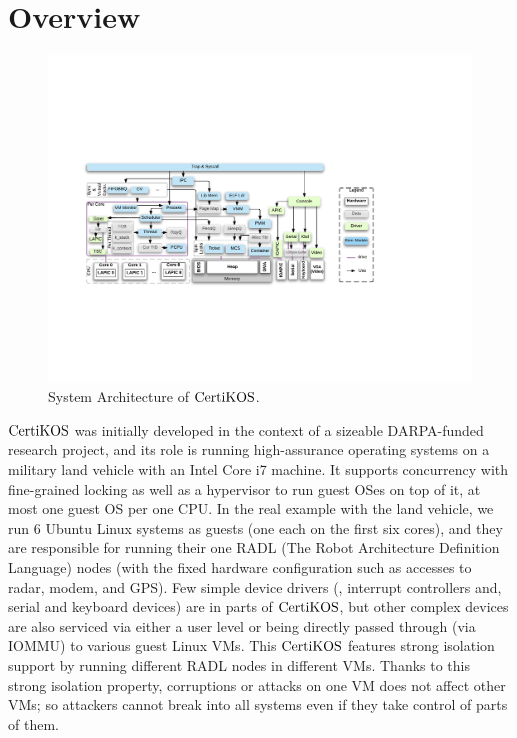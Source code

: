 \section{Overview}
\label{chapter:certikos:sec:overview}

\begin{figure}
\includegraphics[width=\textwidth]{figs/certikos/sysarch}
\caption{System Architecture of $\mathrm{CertiKOS}$.}
\label{fig:chapter:certikos:system-architecture-of-certikos}
\end{figure}

$\mathrm{CertiKOS}$ was initially developed in the context of a sizeable DARPA-funded research project,
and its role is running high-assurance operating systems on a military land vehicle with an Intel Core i7 machine. 
It supports concurrency with fine-grained locking as well as a hypervisor
to run guest OSes on top of it, 
at most one guest OS per one CPU. 
In the real example with the land vehicle, 
we run 6 Ubuntu Linux systems as guests (one each on the first six cores), 
and  they are responsible for running  their one RADL (The Robot Architecture Definition Language) nodes (with the fixed hardware configuration such as accesses to radar, modem, and GPS). 
Few simple device drivers (\eg, interrupt controllers and, serial and keyboard devices)  are in parts of $\mathrm{CertiKOS}$,
but other complex devices are also serviced via either a user level or being directly passed through (via IOMMU) to various guest Linux VMs. 
This $\mathrm{CertiKOS}$ features strong isolation support by running different RADL nodes in different VMs. 
Thanks to this strong isolation property, corruptions or attacks on one VM does not affect other VMs; so
attackers cannot break into all systems even if they take control of parts of them.

